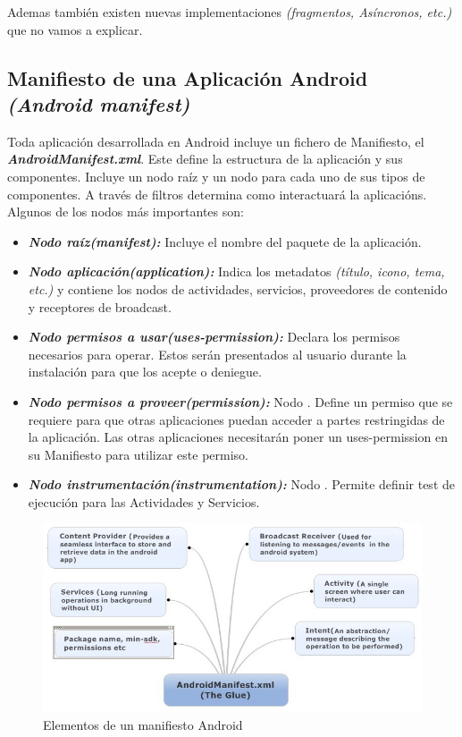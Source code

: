 Ademas también existen nuevas implementaciones \textit{(fragmentos, Asíncronos, etc.)} que no vamos a explicar.

\subsection{Manifiesto de una Aplicación Android \textit{(Android manifest)}}

Toda aplicación desarrollada en Android incluye un fichero de Manifiesto, el \textit{\textbf{AndroidManifest.xml}}. Este define la estructura de la aplicación y sus componentes. Incluye un nodo raíz y un nodo para cada uno de sus tipos de componentes. A través de filtros determina como interactuará la aplicacións. 
Algunos de los nodos más importantes son: 
\begin{itemize}
	\item \emph{\textbf{Nodo raíz\textit{(manifest)}: }} Incluye el nombre del paquete de la aplicación. 
	
	\item \emph{\textbf{Nodo aplicación\textit{(application)}: }} Indica los metadatos \textit{(título, icono, tema, etc.)} y contiene los nodos de actividades, servicios, proveedores de contenido y receptores de broadcast. 

	\item \emph{\textbf{Nodo permisos a usar\textit{(uses-permission)}: }}  Declara los permisos necesarios para operar. Estos serán presentados al usuario durante la instalación para que los acepte o deniegue. 

	\item \emph{\textbf{Nodo permisos a proveer\textit{(permission)}: }} Nodo . Define un permiso que se requiere para que otras aplicaciones puedan acceder a partes restringidas de la aplicación. Las otras aplicaciones necesitarán poner un uses-permission en su Manifiesto para utilizar este permiso. 
	
	\item \emph{\textbf{Nodo instrumentación\textit{(instrumentation)}: }} Nodo . Permite definir test de ejecución para las Actividades y Servicios. 
\end{itemize}	

\begin{figure}[H]
	\centering
	\includegraphics[width=0.95\linewidth]{figuras/androidmanifest}
	\caption{Elementos de un manifiesto Android}
	\label{fig:androidmanifest}
\end{figure}


